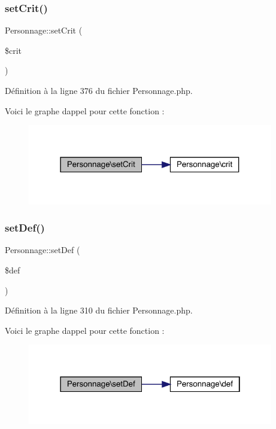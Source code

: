 \subsubsection{\texorpdfstring{set\+Crit()}{setCrit()}}
{\footnotesize\ttfamily Personnage\+::set\+Crit (\begin{DoxyParamCaption}\item[{}]{\$crit }\end{DoxyParamCaption})}



Définition à la ligne 376 du fichier Personnage.\+php.

Voici le graphe d\textquotesingle{}appel pour cette fonction \+:\nopagebreak
\begin{figure}[H]
\begin{center}
\leavevmode
\includegraphics[width=304pt]{class_personnage_a5caf7c4c695a03b2d5ade3ec5963d749_cgraph}
\end{center}
\end{figure}
\mbox{\label{class_personnage_abe66826f9e8f8764566fcebc25bdb080}} 
\subsubsection{\texorpdfstring{set\+Def()}{setDef()}}
{\footnotesize\ttfamily Personnage\+::set\+Def (\begin{DoxyParamCaption}\item[{}]{\$def }\end{DoxyParamCaption})}



Définition à la ligne 310 du fichier Personnage.\+php.

Voici le graphe d\textquotesingle{}appel pour cette fonction \+:\nopagebreak
\begin{figure}[H]
\begin{center}
\leavevmode
\includegraphics[width=304pt]{class_personnage_abe66826f9e8f8764566fcebc25bdb080_cgraph}
\end{center}
\end{figure}
\mbox{\label{class_personnage_aec0f318abc45dee8a4b011722efd74ed}} 
